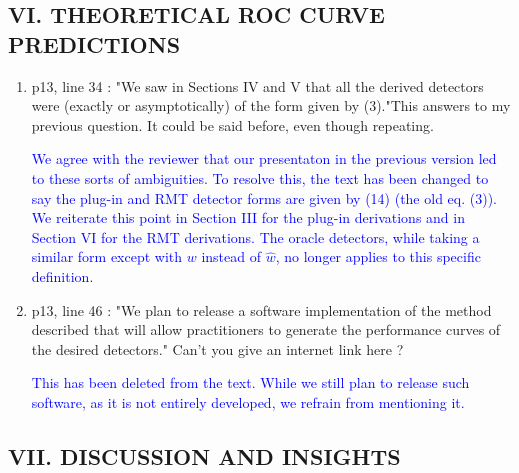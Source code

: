 \documentclass[11pt]{article}
\begin{document}
\subsection*{VI. THEORETICAL ROC CURVE PREDICTIONS}

\begin{enumerate}
\item p13, line 34 : "We saw in Sections IV and V that all the derived detectors were (exactly or asymptotically)
of the form given by (3)."This answers to my previous question. It could be said before, even though repeating.

\textcolor{blue}{We agree with the reviewer that our presentaton in the previous version led to these sorts of ambiguities. To resolve this, the text has been changed to say the plug-in and RMT detector forms are given by (14) (the old eq. (3)). We reiterate this point in Section III for the plug-in derivations and in Section VI for the RMT derivations. The oracle detectors, while taking a similar form except with $w$ instead of $\widehat{w}$, no longer applies to this specific definition.}

\item p13, line 46 : "We plan to release a software implementation of the method described that will allow
practitioners to generate the performance curves of the desired detectors." Can't you give an internet link
here ?

\textcolor{blue}{This has been deleted from the text. While we still plan to release such software, as it is not entirely developed, we refrain from mentioning it.}

\end{enumerate}
\subsection*{VII. DISCUSSION AND INSIGHTS}
\end{document}
